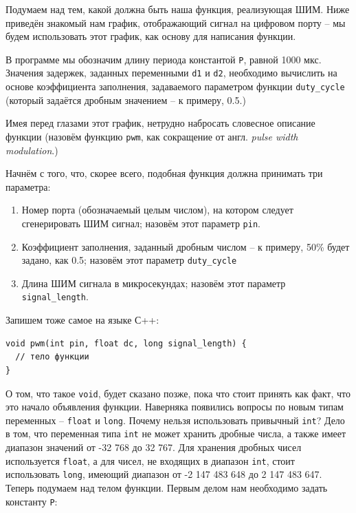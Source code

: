 \documentclass[a4paper,twoside]{book}
\begin{document}
Подумаем над тем, какой должна быть наша функция, реализующая ШИМ. Ниже приведён
знакомый нам график, отображающий сигнал на цифровом порту -- мы будем
использовать этот график, как основу для написания функции.


В программе мы обозначим длину периода константой \texttt{P}, равной 1000 мкс.
Значения задержек, заданных переменными \texttt{d1} и \texttt{d2}, необходимо
вычислить на основе коэффициента заполнения, задаваемого параметром функции
\texttt{duty\_cycle} (который задаётся дробным значением -- к примеру, 0.5.)

Имея перед глазами этот график, нетрудно набросать словесное описание функции
(назовём функцию \texttt{pwm}, как сокращение от англ. \emph{pulse width
  modulation}.)

Начнём с того, что, скорее всего, подобная функция должна принимать три
параметра:
\begin{enumerate}
\item Номер порта (обозначаемый целым числом), на котором следует сгенерировать
  ШИМ сигнал; назовём этот параметр \texttt{pin}.
\item Коэффициент заполнения, заданный дробным числом -- к примеру, 50\% будет
  задано, как 0.5; назовём этот параметр \texttt{duty\_cycle}
\item Длина ШИМ сигнала в микросекундах; назовём этот параметр
  \texttt{signal\_length}.
\end{enumerate}

Запишем тоже самое на языке С++:

\begin{verbatim}
void pwm(int pin, float dc, long signal_length) {
  // тело функции
}
\end{verbatim}

О том, что такое \texttt{void}, будет сказано позже, пока что стоит принять как
факт, что это начало объявления функции. Наверняка появились вопросы по новым
типам переменных -- \texttt{float} и \texttt{long}. Почему нельзя использовать
привычный \texttt{int}? Дело в том, что переменная типа \texttt{int} не может
хранить дробные числа, а также имеет диапазон значений от -32 768 до 32 767. Для
хранения дробных чисел используется \texttt{float}, а для чисел, не входящих в
диапазон \texttt{int}, стоит использовать \texttt{long}, имеющий диапазон от -2
147 483 648 до 2 147 483 647. Теперь подумаем над телом функции. Первым делом
нам необходимо задать константу \texttt{P}:
\end{document}
